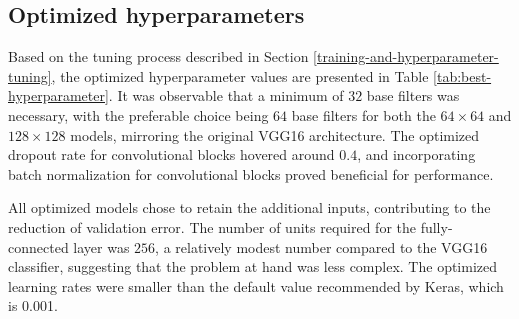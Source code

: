 \documentclass[]{interact}
\theoremstyle{plain}%
\theoremstyle{definition}
\theoremstyle{remark}
\begin{document}
\subsection{Optimized hyperparameters}\label{optimized-hyperparameters}

Based on the tuning process described in Section
\ref{training-and-hyperparameter-tuning}, the optimized hyperparameter
values are presented in Table \ref{tab:best-hyperparameter}. It was
observable that a minimum of \(32\) base filters was necessary, with the
preferable choice being \(64\) base filters for both the
\(64 \times 64\) and \(128 \times 128\) models, mirroring the original
VGG16 architecture. The optimized dropout rate for convolutional blocks
hovered around \(0.4\), and incorporating batch normalization for
convolutional blocks proved beneficial for performance.

All optimized models chose to retain the additional inputs, contributing
to the reduction of validation error. The number of units required for
the fully-connected layer was \(256\), a relatively modest number
compared to the VGG16 classifier, suggesting that the problem at hand
was less complex. The optimized learning rates were smaller than the
default value recommended by Keras, which is 0.001.

\begin{table}

\caption{\label{tab:best-hyperparameter}Hyperparameters values for the optimized computer vision models with different input sizes.}
\centering
{}
\end{table}
\end{document}
